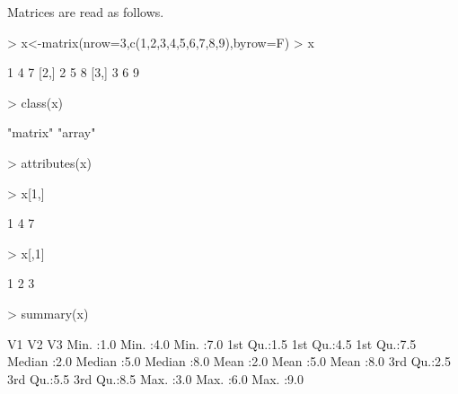 \documentclass[12pt,A4,makeidx]{article}
\begin{document}
Matrices are read as follows.
\begin{Schunk}
\begin{Sinput}
> x<-matrix(nrow=3,c(1,2,3,4,5,6,7,8,9),byrow=F)
> x
\end{Sinput}
\begin{Soutput}
     [,1] [,2] [,3]
[1,]    1    4    7
[2,]    2    5    8
[3,]    3    6    9
\end{Soutput}
\begin{Sinput}
> class(x)
\end{Sinput}
\begin{Soutput}
[1] "matrix" "array" 
\end{Soutput}
\begin{Sinput}
> attributes(x)
\end{Sinput}
\begin{Sinput}
> x[1,]
\end{Sinput}
\begin{Soutput}
[1] 1 4 7
\end{Soutput}
\begin{Sinput}
> x[,1]
\end{Sinput}
\begin{Soutput}
[1] 1 2 3
\end{Soutput}
\begin{Sinput}
> summary(x)
\end{Sinput}
\begin{Soutput}
       V1            V2            V3     
 Min.   :1.0   Min.   :4.0   Min.   :7.0  
 1st Qu.:1.5   1st Qu.:4.5   1st Qu.:7.5  
 Median :2.0   Median :5.0   Median :8.0  
 Mean   :2.0   Mean   :5.0   Mean   :8.0  
 3rd Qu.:2.5   3rd Qu.:5.5   3rd Qu.:8.5  
 Max.   :3.0   Max.   :6.0   Max.   :9.0  
\end{Soutput}
\end{Schunk}
\end{document}
